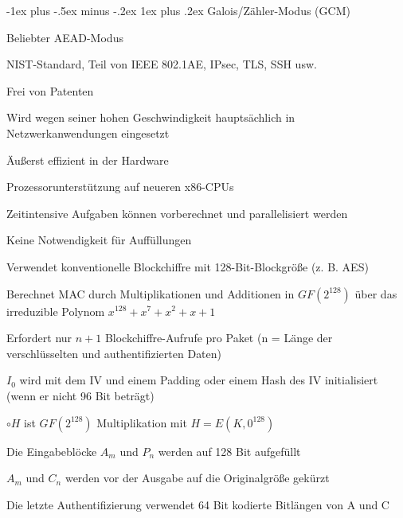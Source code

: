 \documentclass[a4paper]{article}
\makeatletter
\renewcommand{\subsubsection}{\@startsection{subsubsection}{3}{0mm}%
 {-1ex plus -.5ex minus -.2ex}%
 {1ex plus .2ex}%
 {\normalfont\small\bfseries}}
\makeatother
\begin{document}
\begin{multicols}{3}
      \subsubsection{Galois/Zähler-Modus (GCM)}
      \begin{itemize*}
            \item Beliebter AEAD-Modus
            \item NIST-Standard, Teil von IEEE 802.1AE, IPsec, TLS, SSH usw.
            \item Frei von Patenten
            \item Wird wegen seiner hohen Geschwindigkeit hauptsächlich in Netzwerkanwendungen eingesetzt
            \begin{itemize*}
                  \item Äußerst effizient in der Hardware
                  \item Prozessorunterstützung auf neueren x86-CPUs
                  \item Zeitintensive Aufgaben können vorberechnet und parallelisiert werden
                  \item Keine Notwendigkeit für Auffüllungen
            \end{itemize*}
            \item Verwendet konventionelle Blockchiffre mit 128-Bit-Blockgröße (z. B. AES)
            \item Berechnet MAC durch Multiplikationen und Additionen in $GF(2^{128})$ über das irreduzible Polynom $x^{128}+x^{7}+x^{2}+x+1$
            \item Erfordert nur $n+1$ Blockchiffre-Aufrufe pro Paket (n = Länge der verschlüsselten und authentifizierten Daten)
            \begin{itemize*}
                  \item $I_0$ wird mit dem IV und einem Padding oder einem Hash des IV initialisiert (wenn er nicht 96 Bit beträgt)
                  \item $\circ H$ ist $GF(2^{128})$ Multiplikation mit $H=E(K,0^{128})$
                  \item Die Eingabeblöcke $A_m$ und $P_n$ werden auf 128 Bit aufgefüllt
                  \item $A_m$ und $C_n$ werden vor der Ausgabe auf die Originalgröße gekürzt
                  \item Die letzte Authentifizierung verwendet 64 Bit kodierte Bitlängen von A und C

\end{itemize*}
\end{itemize*}
\end{multicols}
\end{document}
